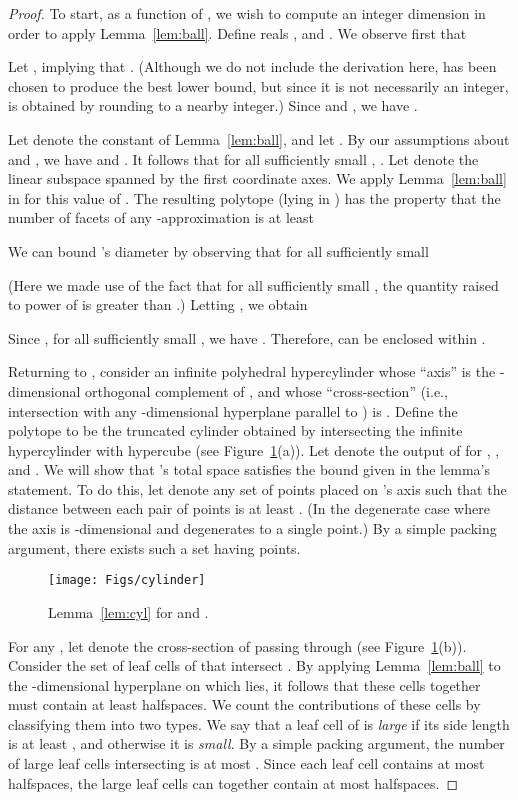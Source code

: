 \documentclass[11pt]{article}   \usepackage[letterpaper,hmargin=2.1cm,vmargin=3cm]{geometry}
\begin{document}
\begin{proof}
To start, as a function of , we wish to compute an integer dimension  in order to apply Lemma~\ref{lem:ball}. Define reals ,  and . We observe first that

Let , implying that . (Although we do not include the derivation here,  has been chosen to produce the best lower bound, but since it is not necessarily an integer,  is obtained by rounding to a nearby integer.) Since  and , we have .

Let  denote the constant of Lemma~\ref{lem:ball}, and let . By our assumptions about  and , we have  and . It follows that for all sufficiently small , . Let  denote the linear subspace spanned by the first  coordinate axes. We apply Lemma~\ref{lem:ball} in  for this value of . The resulting polytope  (lying in ) has the property that the number of facets of any -approximation is at least

We can bound 's diameter by observing that for all sufficiently small 

(Here we made use of the fact that for all sufficiently small , the quantity raised to power of  is greater than .) Letting , we obtain

Since , for all sufficiently small , we have . Therefore,  can be enclosed within .

Returning to , consider an infinite polyhedral hypercylinder whose ``axis'' is the -dimensional orthogonal complement of , and whose ``cross-section'' (i.e., intersection with any -dimensional hyperplane parallel to ) is . Define the polytope  to be the truncated cylinder obtained by intersecting the infinite hypercylinder with hypercube  (see Figure~\ref{fig:cylinder}(a)). Let  denote the output of  for , , and . We will show that 's total space satisfies the bound given in the lemma's statement. To do this, let  denote any set of points placed on 's axis such that the distance between each pair of points is at least . (In the degenerate case where  the axis is -dimensional and  degenerates to a single point.) By a simple packing argument, there exists such a set having  points.

\begin{figure}[htbp]
  \centerline{\texttt{[image: Figs/cylinder]}}
  \caption{Lemma~\ref{lem:cyl} for  and .}
  \label{fig:cylinder}
\end{figure}


For any , let  denote the cross-section of  passing through  (see Figure~\ref{fig:cylinder}(b)). Consider the set of leaf cells of  that intersect . By applying Lemma~\ref{lem:ball} to the -dimensional hyperplane on which  lies, it follows that these cells together must contain at least  halfspaces. We count the contributions of these cells by classifying them into two types. We say that a leaf cell of  is \emph{large} if its side length is at least , and otherwise it is \emph{small}. By a simple packing argument, the number of large leaf cells intersecting  is at most . Since each leaf cell contains at most  halfspaces, the large leaf cells can together contain at most  halfspaces. 


\end{proof}
\end{document}

